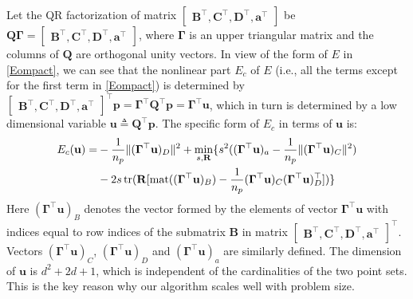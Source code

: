 \documentclass[11pt,bezier,]{article}
\begin{document}
Let the QR factorization of matrix $
\begin{bmatrix}
\mathbf B^\top, \mathbf C^\top, \mathbf D^\top,\mathbf  a^\top
\end{bmatrix}
$ be
$
\mathbf  Q\mathbf  \Gamma=\begin{bmatrix}
\mathbf B^\top ,\mathbf C^\top,\mathbf D^\top,\mathbf  a^\top
\end{bmatrix}
$,
where $\mathbf \Gamma$ is an upper triangular matrix and 
the columns of $\mathbf Q$ are  orthogonal unity vectors.
In view of the form of $E$ in  \eqref{Eompact},
we can see  that the nonlinear part $E_{c}$ of $E$ 
(i.e., all the terms except for the first term in \eqref{Eompact})  
is   determined by 
$\begin{bmatrix}
\mathbf B^\top ,\mathbf C^\top,\mathbf D^\top,\mathbf  a^\top
\end{bmatrix}^\top\mathbf p = \mathbf\Gamma^\top \mathbf Q^\top\mathbf p =\mathbf  \Gamma^\top\mathbf u$,
which in turn is determined by a low dimensional variable $\mathbf u\triangleq  \mathbf Q^\top\mathbf p$.
The specific form of $E_{c}$ in terms of $\mathbf u$ is:
\begin{align}
 E_{c}( \mathbf u) = &
- \frac{1}{n_p} \|(\mathbf \Gamma^\top\mathbf u)_D \|^2  %
+ \min_{s,\mathbf R} \{s^2 ( (\mathbf \Gamma^\top\mathbf u)_a  
- \frac{1}{n_p}    \|(\mathbf \Gamma^\top\mathbf u)_C \|^2)  \notag\\ 
& - 2s\, \text{tr}(\mathbf R [ \text{mat} ((\mathbf \Gamma^\top\mathbf u)_B)  
- \frac{1}{n_p} (\mathbf \Gamma^\top\mathbf u)_C (\mathbf \Gamma^\top\mathbf u)_D^\top  ]) \} 
\end{align}
Here  $(\mathbf \Gamma^\top\mathbf u)_{B}$ denotes the vector 
formed by the elements of vector $\mathbf \Gamma^\top\mathbf u$ 
with indices  equal to  row indices  of the
submatrix $\mathbf B$ in matrix $\begin{bmatrix}
\mathbf B^\top,\mathbf C^\top,\mathbf D^\top ,\mathbf  a^\top
\end{bmatrix}^\top$.
Vectors $(\mathbf \Gamma^\top\mathbf u)_{C}$, $(\mathbf \Gamma^\top\mathbf u)_{D}$ 
and $(\mathbf \Gamma^\top\mathbf u)_{ a}$ are similarly defined.
The dimension of $\mathbf u$ is $d^2+2d+1 $,
which is 
 independent of the cardinalities  of the two point sets.
This is the key reason why  our algorithm 
scales well with  problem size.
\end{document}
